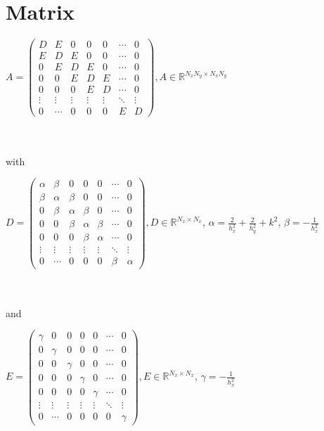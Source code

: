 \section{Matrix}

$A =
 \left. \begin{pmatrix}
  	D 		& E 		& 0 		& 0 		& 0 		& \cdots 		& 0 \\
  	E 		& D 		& E 		& 0 		& 0 		& \cdots 		& 0 \\
	0 		& E 		& D 		& E 		& 0 		& \cdots 		& 0 \\
	0 		& 0 		& E 		& D 		& E 		& \cdots 		& 0 \\
	0 		& 0 		& 0 		& E 		& D 		& \cdots 		& 0 \\
  	\vdots  	& \vdots  	& \vdots 	& \vdots 	& \vdots  	& \ddots 		& \vdots\\
  	0 		& \cdots 	& 0 		& 0 		& 0		& E 			& D
 \end{pmatrix}
\right. \text{$, A \in \mathbb{R}^{N_{x}N_{y} \times N_{x}N_{y}}$}$

\hfill \\
\hfill \\
with \newline
\newline

$D =
\left. \begin{pmatrix}
	\alpha		& \beta	& 0 		& 0 		& 0 		& \cdots 		& 0 \\
  	\beta 		& \alpha	& \beta	& 0 		& 0 		& \cdots 		& 0 \\
	0 		& \beta	& \alpha	& \beta	& 0 		& \cdots 		& 0 \\
	0 		& 0 		& \beta	& \alpha	& \beta	& \cdots 		& 0 \\
	0 		& 0 		& 0 		& \beta	& \alpha	& \cdots 		& 0 \\
  	\vdots  	& \vdots  	& \vdots 	& \vdots 	& \vdots  	& \ddots 		& \vdots\\
  	0 		& \cdots 	& 0 		& 0 		& 0		& \beta		& \alpha
\end{pmatrix}
\right. \text{$, D \in \mathbb{R}^{N_{x} \times N_{x}}$, $\alpha = \frac{2}{h_{x}^{2}} + \frac{2}{h_{y}^{2}} + k^{2}$, $\beta = - \frac{1}{h_{x}^{2}}$}$

\hfill \\
\hfill \\
and\newline
\newline

$E =
\left. \begin{pmatrix}
	\gamma	& 0		& 0 		& 0 		& 0 		& \cdots 		& 0 \\
  	0		& \gamma	& 0 		& 0 		& 0 		& \cdots 		& 0 \\
	0 		& 0 		& \gamma	& 0		& 0 		& \cdots 		& 0 \\
	0 		& 0 		& 0 		& \gamma	& 0 		& \cdots 		& 0 \\
	0 		& 0 		& 0 		& 0 		& \gamma	& \cdots 		& 0 \\
  	\vdots  	& \vdots  	& \vdots 	& \vdots 	& \vdots  	& \ddots 		& \vdots\\
  	0 		& \cdots 	& 0 		& 0 		& 0		& 0 			& \gamma
\end{pmatrix}
\right. \text{$, E \in \mathbb{R}^{N_{x} \times N_{x}}$, $\gamma = - \frac{1}{h_{x}^{2}}$}$

